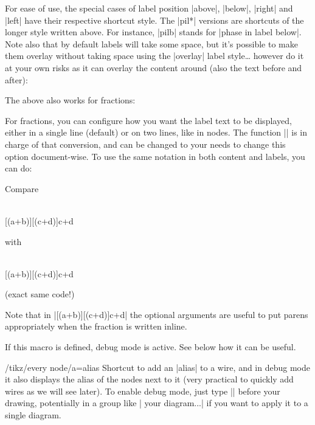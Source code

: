 \documentclass[a4paper]{ltxdoc}
\begin{document}
{\begin{pgfmanualentry}
For ease of use, the special cases of label position |above|, |below|, |right| and |left| have their respective shortcut style. The |pil*| versions are shortcuts of the longer style written above. For instance, |pilb| stands for |phase in label below|. Note also that by default labels will take some space, but it's possible to make them overlay without taking space using the |overlay| label style\dots{} however do it at your own risks as it can overlay the content around (also the text before and after):
\begin{codeexample}[width=0pt]
  \zx{
    \zxZ[pilb]{\alpha+\beta} \rar & \zxX[pilb]{\gamma} \rar & \zxZ[pilb=overlay]{\gamma+\eta}
  }
\end{codeexample}
The above also works for fractions:
\begin{codeexample}[]
\end{codeexample}
For fractions, you can configure how you want the label text to be displayed, either in a single line (default) or on two lines, like in nodes. The function |\zxConvertToFracInLabel| is in charge of that conversion, and can be changed to your needs to change this option document-wise. To use the same notation in both content and labels, you can do:
\begin{codeexample}[width=0pt]
  Compare
  \begin{ZX}
     \dar \\
    [(a+b)][(c+d)]{c+d}
  \end{ZX} with
{
  \begin{ZX}
     \dar \\
    [(a+b)][(c+d)]{c+d}
  \end{ZX} (exact same code!)
}
\end{codeexample}
Note that in |[(a+b)][(c+d)]{c+d}| the optional arguments are useful to put parens appropriately when the fraction is written inline.
\end{pgfmanualentry}

\begin{command}{\zxDebugMode{}}
  If this macro is defined, debug mode is active. See below how it can be useful.
\end{command}
\begin{stylekey}{/tikz/every node/a=alias}
  Shortcut to add an |alias| to a wire, and in debug mode it also displays the alias of the nodes next to it (very practical to quickly add wires as we will see later). To enable debug mode, just type |\def\zxDebugMode{}| before your drawing, potentially in a group like |{\def\zxDebugMode{} your diagram...}| if you want to apply it to a single diagram.


\end{stylekey}}
\end{document}
